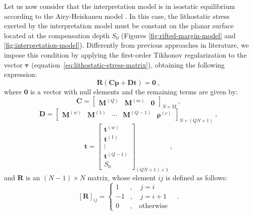 \documentclass[manuscript]{geophysics}
\begin{document}
Let us now consider that the interpretation model is in isostatic equilibrium
according to the Airy-Heiskanen model \citep[][$\,$p. 135]{heiskanen-moritz1967}. 
In this case, the lithostatic stress exerted by the interpretation model
must be constant on the planar surface located at the compensation depth $S_{0}$
(Figures \ref{fig:rifted-margin-model} and \ref{fig:interpretation-model}).
Differently from previous approaches in literature, we impose this condition 
by applying the first-order Tikhonov regularization
\citep{aster-etal2005} to the vector $\boldsymbol{\tau}$
(equation~\ref{eq:lithostatic-stress-matrix}), obtaining the
following expression:
\begin{equation}
\mathbf{R} \left( \mathbf{C} \mathbf{p} + \mathbf{D} \mathbf{t} \right) = \mathbf{0} 
\: ,
\label{eq:tik1-lithostatic-stress}
\end{equation}
where $\mathbf{0}$ is a vector with null elements and the remaining terms are given by:
\begin{equation}
\mathbf{C} = \begin{bmatrix}
\mathbf{M}^{(Q)} & \mathbf{M}^{(m)} & \mathbf{0}
\end{bmatrix}_{N \times M} \: ,
\label{eq:matrix-C}
\end{equation}
\begin{equation}
\mathbf{D} = \begin{bmatrix}
\mathbf{M}^{(w)} & \mathbf{M}^{(1)} & \cdots & \mathbf{M}^{(Q-1)} &
\boldsymbol{\rho}^{(c)}
\end{bmatrix}_{N \times \left( QN + 1 \right)} \: ,
\label{eq:matrix-D}
\end{equation}
\begin{equation}
\mathbf{t} = \begin{bmatrix}
\mathbf{t}^{(w)} \\ \mathbf{t}^{(1)} \\ \vdots \\ \mathbf{t}^{(Q-1)} \\ S_{0}
\end{bmatrix}_{\left( QN + 1 \right) \times 1}\: ,
\label{eq:vector-t}
\end{equation}
and $\mathbf{R}$ is an $\left( N-1 \right) \times N$ matrix, whose element 
$ij$ is defined as follows:
\begin{equation}
\left[ \mathbf{R} \right]_{ij} = \begin{cases}
1 &, \quad j = i \\
-1 &, \quad j = i + 1 \\
0 &, \quad \text{otherwise}
\end{cases} \quad .
\label{eq:matrix-R}
\end{equation}
\end{document}
